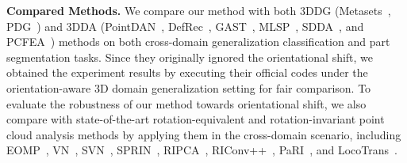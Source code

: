 \noindent\textbf{Compared Methods.}
We compare our method with both 3DDG (Metasets~\cite{huang2021metasets}, PDG~\cite{wei2022learning}) and 3DDA (PointDAN~\cite{qin2019pointdan}, DefRec~\cite{achituve2021self}, GAST~\cite{zou2021geometry}, MLSP~\cite{liang2022point}, SDDA~\cite{cardace2023self}, and PCFEA~\cite{wang2024progressive}) methods on both cross-domain generalization classification and part segmentation tasks. Since they originally ignored the orientational shift, we obtained the experiment results by executing their official codes under the orientation-aware 3D domain generalization setting for fair comparison. To evaluate the robustness of our method towards orientational shift, we also compare with state-of-the-art rotation-equivalent and rotation-invariant point cloud analysis methods by applying them in the cross-domain scenario, including EOMP~\cite{luo2022equivariant}, VN~\cite{Deng_2021_ICCV}, SVN~\cite{su2022svnet}, SPRIN~\cite{you2021prin}, RIPCA~\cite{li2021closer}, RIConv++~\cite{zhang2022riconv}, PaRI~\cite{chen2022devil}, and LocoTrans~\cite{chen2024local}. 


